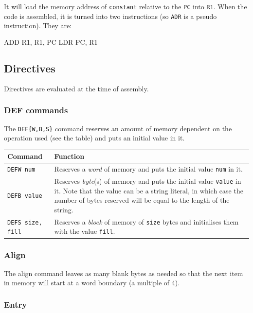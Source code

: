 It will load the memory address of {\tt constant} relative to the {\tt PC} into
{\tt R1}. When the code is assembled, it is turned into two instructions (so
{\tt ADR} is a pseudo instruction). They are:

\begin{listing}{1}
	ADD R1, R1, PC
	LDR PC, R1
\end{listing}

\subsection{Directives}
Directives are evaluated at the time of assembly.

\subsubsection{DEF commands}

The {\tt DEF\{W,B,S\}} command reserves an amount of memory dependent on the
operation used (see the table) and puts an initial value in it.

\begin{tabularx}{\textwidth}{l|X}
	{\bf Command} & {\bf Function}\\ \hline

	{\tt DEFW num} & Reserves a {\it word} of memory and puts the initial
	value {\tt num} in it.\\ \hline

	{\tt DEFB value} & Reserves {\it byte}(s) of memory and puts the initial
	value {\tt value} in it. Note that the value can be a string literal, in
	which case the number of bytes reserved will be equal to the length of the
	string.\\ \hline

	{\tt DEFS size, fill} & Reserves a {\it block} of memory of {\tt size}
	bytes and initialises them with the value {\tt fill}. \\ \hline	
\end{tabularx}

\subsubsection{Align}
\label{subsubsec:align}

The align command leaves as many blank bytes as needed so that the next item in
memory will start at a word boundary (a multiple of 4).

\subsubsection{Entry}

